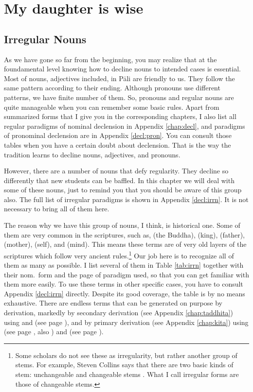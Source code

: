 \chapter{My daughter is wise}\label{chap:irrn}

{}
\section*{Irregular Nouns}

As we have gone so far from the beginning, you may realize that at the foundamental level knowing how to decline nouns to intended cases is essential. Most of nouns, adjectives included, in P\=ali are friendly to us. They follow the same pattern according to their ending. Although pronouns use different patterns, we have finite number of them. So, pronouns and regular nouns are quite manageable when you can remember some basic rules. Apart from summarized forms that I give you in the corresponding chapters, I also list all regular paradigms of nominal declension in Appendix \ref{chap:decl}, and paradigms of pronominal declension are in Appendix \ref{decl:pron}. You can consult those tables when you have a certain doubt about declension. That is the way the tradition learns to decline nouns, adjectives, and pronouns.

However, there are a number of nouns that defy regularity. They decline so differently that new students can be baffled. In this chapter we will deal with some of these nouns, just to remind you that you should be aware of this group also. The full list of irregular paradigms is shown in Appendix \ref{decl:irrn}. It is not necessary to bring all of them here.

The reason why we have this group of nouns, I think, is historical one. Some of them are very common in the scriptures, such as,  (the Buddha),  (king),  (father),  (mother),  (self), and  (mind). This means these terms are of very old layers of the scriptures which follow very ancient rules.\footnote{Some scholars do not see these as irregularity, but rather another group of stems. For example, Steven Collins says that there are two basic kinds of stem: unchangeable and changeable stems \citep[p.~52]{collins:grammar}. What I call irregular forms are those of changeable stems.} Our job here is to recognize all of them as many as possible. I list several of them in Table \ref{tab:irrn} together with their nom.\ form and the page of paradigm used, so that you can get familiar with them more easily. To use these terms in other specific cases, you have to consult Appendix \ref{decl:irrn} directly. Despite its good coverage, the table is by no means exhaustive. There are endless terms that can be generated on purpose by derivation, markedly by secondary derivation (see Appendix \ref{chap:taddhita}) using  and  (see page \pageref{pacct10:vantu}), and by primary derivation (see Appendix \ref{chap:kita}) using  (see page \pageref{pacck1:tu}, also \pageref{pacck11:ratthu}) and  (see page \pageref{pacck10:anta}).

